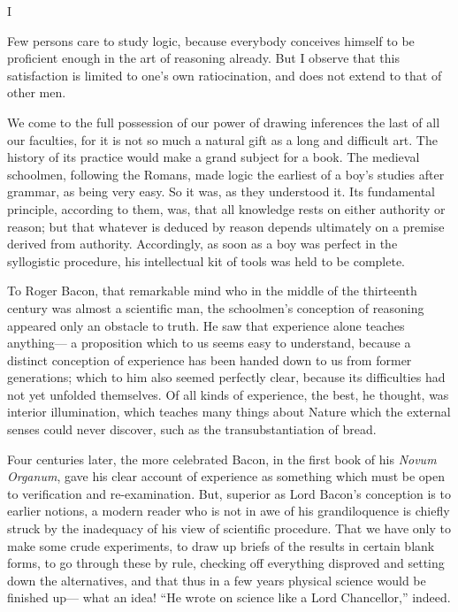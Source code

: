 \documentclass[]{article}
\newcommand{\itemsection}[1]{\bigskip\centerline{#1}\nopagebreak}
\begin{document}
\itemsection{I}


Few persons care to study logic, because everybody conceives himself to be proficient enough in the art of reasoning already. But I observe that this satisfaction is limited to one's own ratiocination, and does not extend to that of other men.

We come to the full possession of our power of drawing inferences the last of all our faculties, for it is not so much a natural gift as a long and difficult art. The history of its practice would make a grand subject for a book. The medieval schoolmen, following the Romans, made logic the earliest of a boy's studies after grammar, as being very easy. So it was, as they understood it. Its fundamental principle, according to them, was, that all knowledge rests on either authority or reason; but that whatever is deduced by reason depends ultimately on a premise derived from authority. Accordingly, as soon as a boy was perfect in the syllogistic procedure, his intellectual kit of tools was held to be complete.

To Roger Bacon, that remarkable mind who in the middle of the thirteenth century was almost a scientific man, the schoolmen's conception of reasoning appeared only an obstacle to truth. He saw that experience alone teaches anything--- a proposition which to us seems easy to understand, because a distinct conception of experience has been handed down to us from former generations; which to him also seemed perfectly clear, because its difficulties had not yet unfolded themselves. Of all kinds of experience, the best, he thought, was interior illumination, which teaches many things about Nature which the external senses could never discover, such as the transubstantiation of bread.

Four centuries later, the more celebrated Bacon, in the first book of his \emph{Novum Organum}, gave his clear account of experience as something which must be open to verification and re-examination. But, superior as Lord Bacon's conception is to earlier notions, a modern reader who is not in awe of his grandiloquence is chiefly struck by the inadequacy of his view of scientific procedure. That we have only to make some crude experiments, to draw up briefs of the results in certain blank forms, to go through these by rule, checking off everything disproved and setting down the alternatives, and that thus in a few years physical science would be finished up--- what an idea! ``He wrote on science like a Lord Chancellor,'' indeed. 
\end{document}
